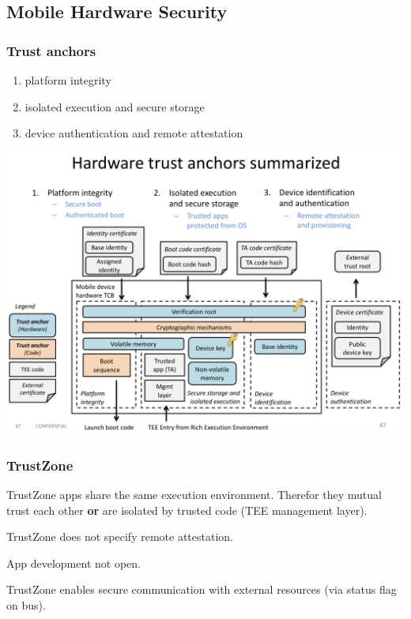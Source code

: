 \subsection{Mobile Hardware Security}
\subsubsection{Trust anchors}
\begin{enumerate}
    \item platform integrity
    \item isolated execution and secure storage
    \item device authentication and remote attestation
\end{enumerate}

\begin{center}
    \includegraphics[width=0.85\linewidth]{images/mobile_sec_HardwareTrustAnchors.png}
\end{center}

\subsubsection{TrustZone}
TrustZone apps share the same execution environment. Therefor they mutual trust each other \textbf{or} are isolated by trusted code (TEE management layer).

TrustZone does not specify remote attestation.

App development not open.

TrustZone enables secure communication with external resources (via status flag on bus).

